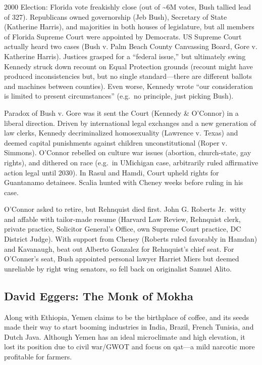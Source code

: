 \documentclass[
]{article}
\begin{document}
2000 Election: Florida vote freakishly close (out of \textasciitilde6M
votes, Bush tallied lead of 327). Republicans owned governorship (Jeb
Bush), Secretary of State (Katherine Harris), and majorities in both
houses of legislature, but all members of Florida Supreme Court were
appointed by Democrats. US Supreme Court actually heard two cases (Bush
v. Palm Beach County Canvassing Board, Gore v. Katherine Harris).
Justices grasped for a ``federal issue,'' but ultimately swing Kennedy
struck down recount on Equal Protection grounds (recount might have
produced inconsistencies but, but no single standard---there are
different ballots and machines between counties). Even worse, Kennedy
wrote ``our consideration is limited to present circumstances'' (e.g.~no
principle, just picking Bush).

Paradox of Bush v. Gore was it sent the Court (Kennedy \& O'Connor) in a
liberal direction. Driven by international legal exchanges and a new
generation of law clerks, Kennedy decriminalized homosexuality (Lawrence
v. Texas) and deemed capital punishments against children
unconstitutional (Roper v. Simmons). O'Connor rebelled on culture war
issues (abortion, church-state, gay rights), and dithered on race
(e.g.~in UMichigan case, arbitrarily ruled affirmative action legal
until 2030). In Rasul and Hamdi, Court upheld rights for Guantanamo
detainees. Scalia hunted with Cheney weeks before ruling in his case.

O'Connor asked to retire, but Rehnquist died first. John G. Roberts
Jr.~witty and affable with tailor-made resume (Harvard Law Review,
Rehnquist clerk, private practice, Solicitor General's Office, own
Supreme Court practice, DC District Judge). With support from Cheney
(Roberts ruled favorably in Hamdan) and Kavanaugh, beat out Alberto
Gonzalez for Rehnquist's chief seat. For O'Conner's seat, Bush appointed
personal lawyer Harriet Miers but deemed unreliable by right wing
senators, so fell back on originalist Samuel Alito.

\hypertarget{david-eggers-the-monk-of-mokha}{%
\subsection{David Eggers: The Monk of
Mokha}\label{david-eggers-the-monk-of-mokha}}

Along with Ethiopia, Yemen claims to be the birthplace of coffee, and
its seeds made their way to start booming industries in India, Brazil,
French Tunisia, and Dutch Java. Although Yemen has an ideal microclimate
and high elevation, it lost its position due to civil war/GWOT and focus
on qat---a mild narcotic more profitable for farmers.
\end{document}

